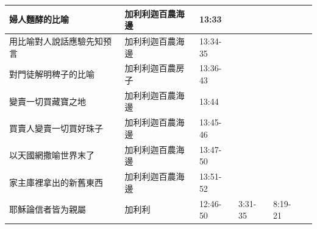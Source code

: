 \begin{table}[H]
\begin{tabular}{p{13.07em}|p{8.43em}|p{5.285em}|p{5.57em}|p{5.285em}|p{4.855em}}
婦人麵酵的比喻& 加利利迦百農海邊& \multicolumn{1}{l|}{13:33} & \multicolumn{1}{l|}{} & & \multicolumn{1}{r}{} \\ \midrule
用比喻對人說話應驗先知预言& 加利利迦百農海邊& \multicolumn{1}{l|}{13:34-35} & \multicolumn{1}{l|}{} & & \multicolumn{1}{r}{} \\ \midrule
對門徒解明稗子的比喻& 加利利迦百農房子& \multicolumn{1}{l|}{13:36-43} & \multicolumn{1}{l|}{} & & \multicolumn{1}{r}{} \\ \midrule
變賣一切買藏寶之地& 加利利迦百農海邊& \multicolumn{1}{l|}{13:44}& \multicolumn{1}{l|}{} && \multicolumn{1}{r}{} \\ \midrule
買賣人變賣一切買好珠子& 加利利迦百農海邊& \multicolumn{1}{l|}{13:45-46} & \multicolumn{1}{l|}{} &  & \multicolumn{1}{r}{} \\ \midrule

以天國網撒喻世界末了& 加利利迦百農海邊& \multicolumn{1}{l|}{13:47-50} & \multicolumn{1}{l|}{} && \multicolumn{1}{r}{} \\ \midrule
家主庫裡拿出的新舊東西& 加利利迦百農海邊& \multicolumn{1}{l|}{13:51-52} & \multicolumn{1}{l|}{} & & \multicolumn{1}{r}{} \\ \midrule

耶穌論信者皆为親屬 & 加利利   & 12:46-50 & 3:31-35 & 8:19-21 & \multicolumn{1}{r}{} \\ \midrule

\end{tabular}%
\end{table}%

